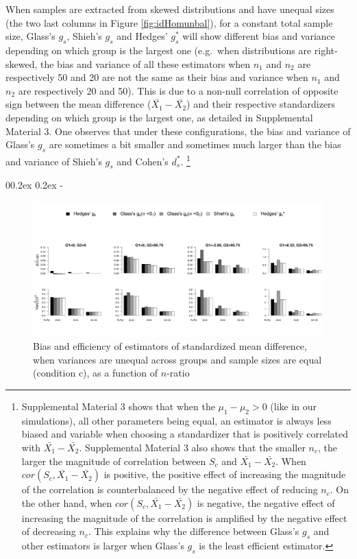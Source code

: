 \documentclass[
  english,
  man,floatsintext]{apa6}
\makeatletter
\let\oldsubparagraph\subparagraph
\renewcommand{\subparagraph}[1]{\oldsubparagraph{#1}\mbox{}}
\renewcommand{\subparagraph}[1]{\@startsection{subparagraph}{5}{1em}%
  {0\baselineskip \@plus 0.2ex \@minus 0.2ex}%
  {-\z@\relax}%
  {\normalfont\normalsize\itshape\hspace{\parindent}{#1}\textit{\addperi}}{\relax}}
\makeatother
\begin{document}
When samples are extracted from skewed distributions and have unequal sizes (the two last columns in Figure \ref{fig:idHomunbal}), for a constant total sample size, Glass's \(g_s\), Shieh's \(g_s\) and Hedges' \(g^*_s\) will show different bias and variance depending on which group is the largest one (e.g.~when distributions are right-skewed, the bias and variance of all these estimators when \(n_1\) and \(n_2\) are respectively 50 and 20 are not the same as their bias and variance when \(n_1\) and \(n_2\) are respectively 20 and 50). This is due to a non-null correlation of opposite sign between the mean difference (\(\bar{X_1}-\bar{X_2}\)) and their respective standardizers depending on which group is the largest one, as detailed in Supplemental Material 3. One observes that under these configurations, the bias and variance of Glass's \(g_s\) are sometimes a bit smaller and sometimes much larger than the bias and variance of Shieh's \(g_s\) and Cohen's \(d^*_s\). \footnote{Supplemental Material 3 shows that when the $\mu_1-\mu_2 >0$ (like in our simulations), all other parameters being equal, an estimator is always less biased and variable when choosing a standardizer that is positively correlated with $\bar{X_1}-\bar{X_2}$. Supplemental Material 3 also shows that the smaller $n_c$, the larger the magnitude of correlation between $S_c$ and $\bar{X_1}-\bar{X_2}$. When $cor(S_c,\bar{X_1}-\bar{X_2})$ is positive, the positive effect of increasing the magnitude of the correlation is counterbalanced by the negative effect of reducing $n_c$. On the other hand, when $cor(S_c,\bar{X_1}-\bar{X_2})$ is negative, the negative effect of increasing the magnitude of the correlation is amplified by the negative effect of decreasing $n_c$. This explains why the difference between Glass's $g_s$ and other estimators is larger when Glass's $g_s$ is the least efficient estimator.}

\hypertarget{when-variances-are-unequal-across-groups}{%
\subparagraph{When variances are unequal across groups}\label{when-variances-are-unequal-across-groups}}

\begin{figure}

{\centering \includegraphics[width=6.3in]{Scripts outputs/Quality of ES measures/Graphs/Unbiased estimators/Combined Figures_relative quality/Het_bal_N} 

}

\caption{Bias and efficiency of estimators of standardized mean difference, when variances are unequal across groups and sample sizes are equal (condition c), as a function of $n$-ratio}\label{fig:idHetbal1}
\end{figure}
\end{document}
